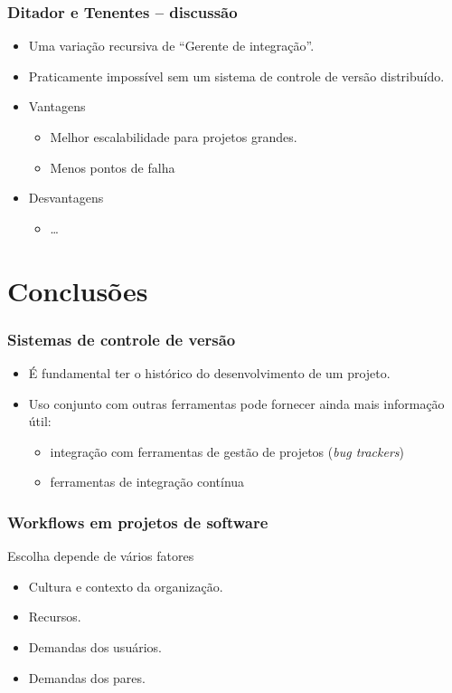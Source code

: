 \documentclass{beamer}
\begin{document}
\begin{frame}
  \frametitle{Ditador e Tenentes -- discussão}
  \begin{itemize}
    \item Uma variação recursiva de ``Gerente de integração''.
    \item Praticamente impossível sem um sistema de controle de versão
      distribuído.
    \item Vantagens
      \begin{itemize}
        \item<2-> Melhor escalabilidade para projetos grandes.
        \item<3-> Menos pontos de falha
      \end{itemize}
    \item Desvantagens
      \begin{itemize}
        \item<4-> \ldots
      \end{itemize}
  \end{itemize}
\end{frame}

\section{Conclusões}

\begin{frame}
  \frametitle{Sistemas de controle de versão}
  \begin{itemize}
    \item É fundamental ter o histórico do desenvolvimento de um
      projeto.
    \item Uso conjunto com outras ferramentas pode fornecer ainda mais
      informação útil:
      \begin{itemize}
        \item integração com ferramentas de gestão de projetos (\emph{bug
          trackers})
        \item ferramentas de integração contínua
      \end{itemize}
  \end{itemize}
\end{frame}

\begin{frame}
  \frametitle{Workflows em projetos de software}
  Escolha depende de vários fatores
  \begin{itemize}
    \item<2-> Cultura e contexto da organização.
    \item<3-> Recursos.
    \item<4-> Demandas dos usuários.
    \item<5-> Demandas dos pares.
  \end{itemize}
\end{frame}
\end{document}
